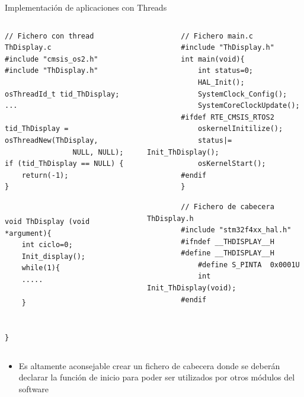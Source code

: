 \begin{frame}[fragile]{Implementación de aplicaciones con Threads}
    \begin{columns}
        \begin{column}{0.50\textwidth}
            \begin{verbatim}
// Fichero con thread ThDisplay.c
#include "cmsis_os2.h"
#include "ThDisplay.h"

osThreadId_t tid_ThDisplay; 
...

tid_ThDisplay = osThreadNew(ThDisplay, 
                NULL, NULL);
if (tid_ThDisplay == NULL) {
    return(-1);
}


void ThDisplay (void *argument){
    int ciclo=0;
    Init_display();
    while(1){
    .....
    
    }
   

}
            \end{verbatim}
        \end{column}
    \begin{column}{0.50\textwidth}
        \begin{verbatim}
        // Fichero main.c
        #include "ThDisplay.h"
        int main(void){
            int status=0;
            HAL_Init();
            SystemClock_Config();
            SystemCoreClockUpdate();
        #ifdef RTE_CMSIS_RTOS2
            oskernelInitilize();
            status|= Init_ThDisplay();
            osKernelStart();
        #endif
        }
        \end{verbatim}
        \begin{verbatim}
        // Fichero de cabecera  ThDisplay.h    
        #include "stm32f4xx_hal.h"     
        #ifndef __THDISPLAY__H
        #define __THDISPLAY__H
            #define S_PINTA  0x0001U
            int Init_ThDisplay(void);
        #endif
        \end{verbatim}
    \end{column}
    \end{columns}
    \begin{itemize}
        \item Es altamente aconsejable crear un fichero de cabecera donde se deberán declarar la función de inicio para poder ser utilizados por otros módulos del software

    \end{itemize}
\end{frame}

